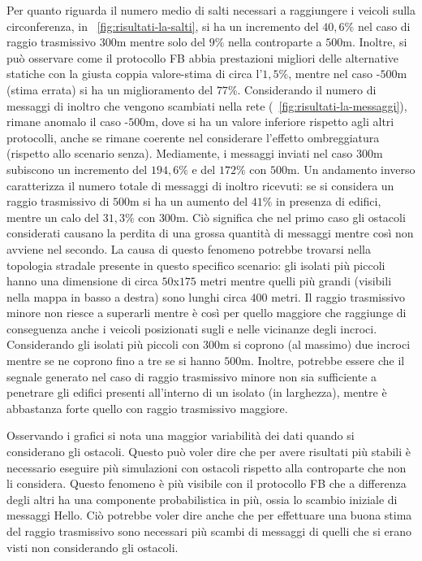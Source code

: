Per quanto riguarda il numero medio di salti necessari a raggiungere i veicoli sulla circonferenza,
in \figurename~\ref{fig:risultati-la-salti},
si ha un incremento del $40,6\%$ nel caso di raggio trasmissivo $300$m mentre solo del $9\%$ nella controparte a $500$m.
Inoltre, si può osservare come il protocollo FB abbia prestazioni migliori delle alternative statiche con la giusta
coppia valore-stima di circa l'$1,5\%$,
mentre nel caso \statica{}-$500$m (stima errata) si ha un miglioramento del $77\%$.
Considerando il numero di messaggi di inoltro che vengono scambiati nella rete (\figurename~\ref{fig:risultati-la-messaggi}),
rimane anomalo il caso \statica{}-$500$m, dove si ha un valore inferiore rispetto agli altri protocolli,
anche se rimane coerente nel considerare l'effetto ombreggiatura (rispetto allo scenario senza).
Mediamente, i messaggi inviati nel caso $300$m subiscono un incremento del $194,6\%$ e del $172\%$
con $500$m.
Un andamento inverso caratterizza il numero totale di messaggi di inoltro ricevuti:
se si considera un raggio trasmissivo di $500$m si ha un aumento del $41\%$ in presenza di edifici,
mentre un calo del $31,3\%$ con $300$m.
Ciò significa che nel primo caso gli ostacoli considerati causano la perdita di una grossa quantità di messaggi
mentre così non avviene nel secondo.
La causa di questo fenomeno potrebbe trovarsi nella topologia stradale presente in questo specifico scenario:
gli isolati più piccoli hanno una dimensione di circa $50$x$175$ metri mentre quelli più grandi
(visibili nella mappa in basso a destra) sono lunghi circa $400$ metri.
Il raggio trasmissivo minore non riesce a superarli mentre è così per quello maggiore che raggiunge
di conseguenza anche i veicoli posizionati sugli e nelle vicinanze degli incroci.
Considerando gli isolati più piccoli con $300$m si coprono (al massimo) due incroci mentre se ne coprono
fino a tre se si hanno $500$m.
Inoltre, potrebbe essere che il segnale generato nel caso di raggio trasmissivo minore
non sia sufficiente a penetrare gli edifici presenti all'interno di un isolato (in larghezza),
mentre è abbastanza forte quello con raggio trasmissivo maggiore.

Osservando i grafici si nota una maggior variabilità dei dati quando si considerano gli ostacoli.
Questo può voler dire che per avere risultati più stabili è necessario eseguire più simulazioni
con ostacoli rispetto alla controparte che non li considera.
Questo fenomeno è più visibile con il protocollo FB che a differenza degli altri
ha una componente probabilistica in più, ossia lo scambio iniziale di messaggi Hello.
Ciò potrebbe voler dire anche che per effettuare una buona stima del raggio trasmissivo
sono necessari più scambi di messaggi di quelli che si erano visti non considerando gli ostacoli. %

